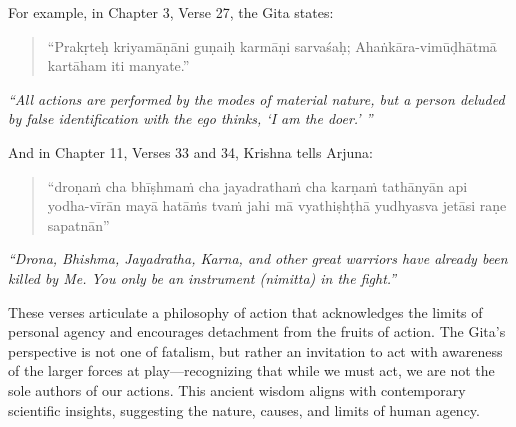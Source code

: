 For example, in Chapter 3, Verse 27, the Gita states:

\begin{quote}
    ``Prakṛteḥ kriyamāṇāni guṇaiḥ karmāṇi sarvaśaḥ;
    Ahaṅkāra-vimūḍhātmā kartāham iti manyate.''
\end{quote}

\textit{``All actions are performed by the modes of material nature, but a person deluded by false identification with the ego thinks, `I am the doer.' ''}

And in Chapter 11, Verses 33 and 34, Krishna tells Arjuna:

\begin{quote}
    ``droṇaṁ cha bhīṣhmaṁ cha jayadrathaṁ cha
    karṇaṁ tathānyān api yodha-vīrān 
    mayā hatāṁs tvaṁ jahi mā vyathiṣhṭhā
    yudhyasva jetāsi raṇe sapatnān''
\end{quote}

\textit{``Drona, Bhishma, Jayadratha, Karna, and other great warriors have already been killed by Me. You only be an instrument (nimitta) in the fight.''}

These verses articulate a philosophy of action that acknowledges the limits of personal agency and encourages detachment from the fruits of action. The Gita's perspective is not one of fatalism, but rather an invitation to act with awareness of the larger forces at play—recognizing that while we must act, we are not the sole authors of our actions. This ancient wisdom aligns with contemporary scientific insights, suggesting the nature, causes, and limits of human agency.
